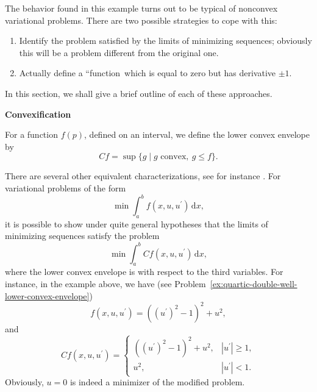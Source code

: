 The behavior found in this example turns out to be typical of nonconvex variational problems. There are two possible strategies to cope with this:\begin{enumerate}\item Identify the problem satisfied by the limits of minimizing sequences; obviously this will be a problem different from the original one.\item Actually define a ``function\textquotesingle\textquotesingle\ which is equal to zero but has derivative $\pm1$.\end{enumerate}In this section, we shall give a brief outline of each of these approaches.

\textbf{Convexification}

\begin{Definition}
\label{def:lower-convex-envelope}
For a function $f(p)$, defined on an interval, we define the lower convex envelope by
\begin{equation}\label{eq:lower-convex-envelope-definition}
Cf=\sup\{g\mid g\text{ convex},\ g\leq f\}.
\end{equation}

\end{Definition}

There are several other equivalent characterizations, see for instance \cite{Dac}. For variational problems of the form
\begin{equation}\label{eq:one-dimensional-unrelaxed-variational-problem}
\min\int_a^bf(x,u,u^{\prime})\,\mathrm{d}x,
\end{equation}
it is possible to show under quite general hypotheses that the limits of minimizing sequences satisfy the problem
\begin{equation}\label{eq:one-dimensional-convexified-variational-problem}
\min\int_a^bCf(x,u,u^{\prime})\,\mathrm{d}x,
\end{equation}
where the lower convex envelope is with respect to the third variables. For instance, in the example above, we have (see Problem~\ref{ex:quartic-double-well-lower-convex-envelope})
\begin{equation}\label{eq:nonconvex-model-integrand}
f(x,u,u^{\prime})=((u^{\prime})^2-1)^2+u^2,
\end{equation}
and
\begin{equation}\label{eq:nonconvex-model-lower-convex-envelope}
Cf(x,u,u^{\prime})=\begin{cases}((u^{\prime})^2-1)^2+u^2,&|u^{\prime}|\geq1,\\u^2,&|u^{\prime}|<1.\end{cases}
\end{equation}
Obviously, $u=0$ is indeed a minimizer of the modified problem.

